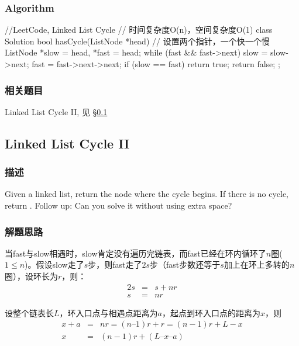 \subsubsection{Algorithm}
\begin{Code}
	//LeetCode, Linked List Cycle
	// 时间复杂度O(n)，空间复杂度O(1)
	class Solution {
		bool hasCycle(ListNode *head) {
			// 设置两个指针，一个快一个慢
			ListNode *slow = head, *fast = head;
			while (fast && fast->next) {
				slow = slow->next;
				fast = fast->next->next;
				if (slow == fast) return true;
			}
			return false;
		}
	};
\end{Code}


\subsubsection{相关题目}
\begindot
\item Linked List Cycle II, 见 \S \ref{sec:Linked-List-Cycle-II}
\myenddot


\subsection{Linked List Cycle II}
\label{sec:Linked-List-Cycle-II}

\subsubsection{描述}
Given a linked list, return the node where the cycle begins. If there is no 
cycle, return .
Follow up:
Can you solve it without using extra space?

\subsubsection{解题思路}
当fast与slow相遇时，slow肯定没有遍历完链表，而fast已经在环内循环了$n$圈($1 \leq 
n$)。假设slow走了$s$步，则fast走了$2s$步（fast步数还等于$s$加上在环上多转的$n$圈），设环长为$r$，则：
\begin{eqnarray}
	2s &=& s + nr \nonumber \\
	s &=& nr \nonumber
\end{eqnarray}

设整个链表长$L$，环入口点与相遇点距离为$a$，起点到环入口点的距离为$x$，则
\begin{eqnarray}
	x + a &=& nr = (n – 1)r +r = (n-1)r + L - x \nonumber \\
	x &=& (n-1)r + (L – x – a) \nonumber
\end{eqnarray}

